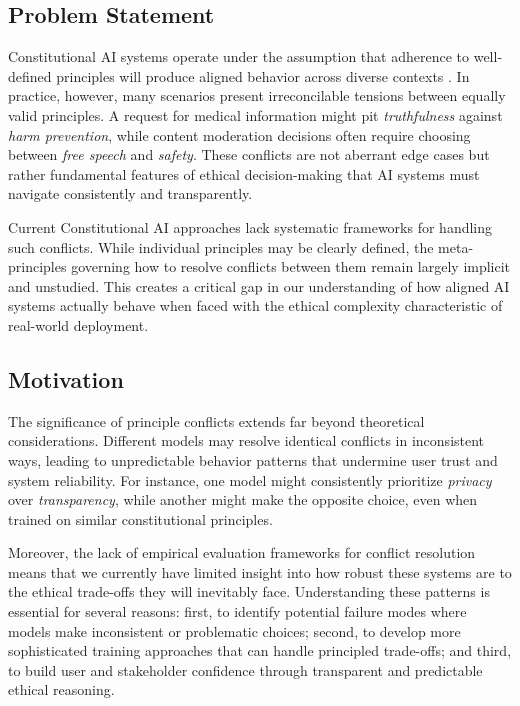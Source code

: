\documentclass[11pt,a4paper]{article}
\newcommand{\principle}[1]{\textit{#1}}
\begin{document}
\subsection{Problem Statement}

Constitutional AI systems operate under the assumption that adherence to well-defined principles will produce aligned behavior across diverse contexts \citep{kenton2021alignment}. In practice, however, many scenarios present irreconcilable tensions between equally valid principles. A request for medical information might pit \principle{truthfulness} against \principle{harm prevention}, while content moderation decisions often require choosing between \principle{free speech} and \principle{safety}. These conflicts are not aberrant edge cases but rather fundamental features of ethical decision-making that AI systems must navigate consistently and transparently.

Current Constitutional AI approaches lack systematic frameworks for handling such conflicts. While individual principles may be clearly defined, the meta-principles governing how to resolve conflicts between them remain largely implicit and unstudied. This creates a critical gap in our understanding of how aligned AI systems actually behave when faced with the ethical complexity characteristic of real-world deployment.

\subsection{Motivation}

The significance of principle conflicts extends far beyond theoretical considerations. Different models may resolve identical conflicts in inconsistent ways, leading to unpredictable behavior patterns that undermine user trust and system reliability. For instance, one model might consistently prioritize \principle{privacy} over \principle{transparency}, while another might make the opposite choice, even when trained on similar constitutional principles.

Moreover, the lack of empirical evaluation frameworks for conflict resolution means that we currently have limited insight into how robust these systems are to the ethical trade-offs they will inevitably face. Understanding these patterns is essential for several reasons: first, to identify potential failure modes where models make inconsistent or problematic choices; second, to develop more sophisticated training approaches that can handle principled trade-offs; and third, to build user and stakeholder confidence through transparent and predictable ethical reasoning.
\end{document}
